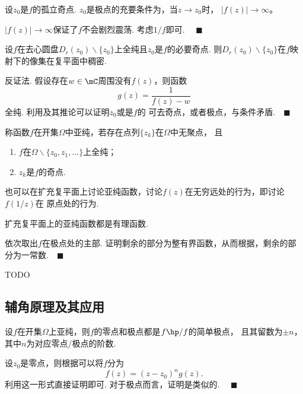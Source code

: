   \begin{cor}
    设$z_0$是$f$的孤立奇点. $z_0$是极点的充要条件为，当$z\to z_0$时，
    $|f(z)|\to\infty$。
  \end{cor}
  \remark
    $|f(z)|\to\infty$保证了$f$不会剧烈震荡.
  \proof
    考虑$1/f$即可. $\quad\blacksquare$

  \begin{thm}
    设$f$在去心圆盘$D_r(z_0)\backslash\{z_0\}$上全纯且$z_0$是$f$的必要奇点.
    则$D_r(z_0)\backslash\{z_0\}$在$f$映射下的像集在复平面中稠密.
  \end{thm}
  \proof
    反证法. 假设存在$w\in\mC$周围没有$f(z)$，则函数
    \[
      g(z) = \frac{1}{f(z)-w}
    \]
    全纯. 利用及其推论可以证明$z_0$或是$f$的
    可去奇点，或者极点，与条件矛盾.$\quad\blacksquare$

  \begin{defi}[亚纯]
    称函数$f$在开集$\Omega$中亚纯，若存在点列$\{z_k\}$在$\Omega$中无聚点，
    且
    \begin{enumerate}
      \item $f$在$\Omega\backslash\{z_0,z_1,\dots\}$上全纯；
      \item ${z_k}$是$f$的奇点.
    \end{enumerate}
  \end{defi}
  \remark
    也可以在扩充复平面上讨论亚纯函数，讨论$f(z)$在无穷远处的行为，即讨论$f(1/z)$在
    原点处的行为.

  \begin{thm}
    扩充复平面上的亚纯函数都是有理函数.
  \end{thm}
  \proof
    依次取出$f$在极点处的主部. 证明剩余的部分为整有界函数，从而根据，剩余的部分为一常数.$\quad\blacksquare$

  \begin{defi}[Riemann球]
    TODO
  \end{defi}




\subsection{辅角原理及其应用}

  \begin{lemma}
    设$f$在开集$\Omega$上亚纯，则$f$的零点和极点都是$f\hp/f$的简单极点，
    且其留数为$\pm n$，其中$n$为对应零点/极点的阶数.
  \end{lemma}
  \proof
    设$z_0$是零点，则根据可以将$f$分为
    \[
      f(z) = (z-z_0)^ng(z).
    \]
    利用这一形式直接证明即可. 对于极点而言，证明是类似的. $\quad\blacksquare$

